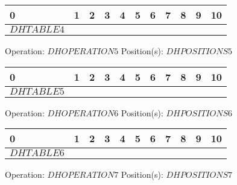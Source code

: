 {{        \begin{center}
            \begin{tabular}{|P{0.75cm}|P{0.75cm}|P{0.75cm}|P{0.75cm}|P{0.75cm}|P{0.75cm}|P{0.75cm}|P{0.75cm}|P{0.75cm}|P{0.75cm}|P{0.75cm}|}
                 & 1 & 2 & 3 & 4 & 5 & 6 & 7 & 8 & 9 & 10  \\
                \hline
                $DHTABLE4$ \\
                \hline
            \end{tabular}
        \end{center}Operation: \underline{\color{tumgadRed}$DHOPERATION5$} \hspace{10px} Position(s): \underline{\color{tumgadRed}$DHPOSITIONS5$}
        \begin{center}
            \begin{tabular}{|P{0.75cm}|P{0.75cm}|P{0.75cm}|P{0.75cm}|P{0.75cm}|P{0.75cm}|P{0.75cm}|P{0.75cm}|P{0.75cm}|P{0.75cm}|P{0.75cm}|}
                 & 1 & 2 & 3 & 4 & 5 & 6 & 7 & 8 & 9 & 10  \\
                \hline
                $DHTABLE5$ \\
                \hline
            \end{tabular}
        \end{center}Operation: \underline{\color{tumgadRed}$DHOPERATION6$} \hspace{10px} Position(s): \underline{\color{tumgadRed}$DHPOSITIONS6$}
        \begin{center}
            \begin{tabular}{|P{0.75cm}|P{0.75cm}|P{0.75cm}|P{0.75cm}|P{0.75cm}|P{0.75cm}|P{0.75cm}|P{0.75cm}|P{0.75cm}|P{0.75cm}|P{0.75cm}|}
                 & 1 & 2 & 3 & 4 & 5 & 6 & 7 & 8 & 9 & 10  \\
                \hline
                $DHTABLE6$ \\
                \hline
            \end{tabular}
        \end{center}Operation: \underline{\color{tumgadRed}$DHOPERATION7$} \hspace{10px} Position(s): \underline{\color{tumgadRed}$DHPOSITIONS7$}
        \begin{center}
            \begin{tabular}{|P{0.75cm}|P{0.75cm}|P{0.75cm}|P{0.75cm}|P{0.75cm}|P{0.75cm}|P{0.75cm}|P{0.75cm}|P{0.75cm}|P{0.75cm}|P{0.75cm}|}
                \hline

\end{tabular}
\end{center}}}
